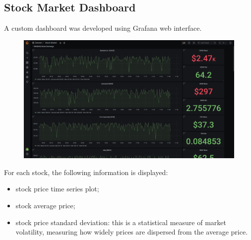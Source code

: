 \documentclass[11pt,a4paper]{article}
\begin{document}
\subsection{Stock Market Dashboard}
A custom dashboard was developed using Grafana web interface.
\begin{figure}[H]
    \centering
    \includegraphics[scale=0.245]{imgs/grafana-dashboard.jpg}
\end{figure}
\noindent
For each stock, the following information is displayed:
\begin{itemize}
    \item stock price time series plot;
    \item stock average price;
    \item stock price standard deviation: this is a statistical measure of market volatility, measuring how widely prices are dispersed from the average price.
\end{itemize}
\end{document}
